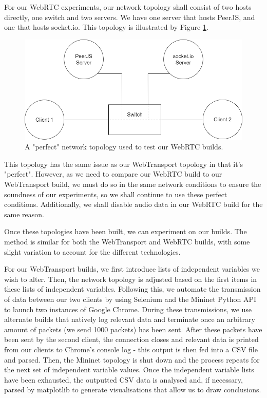 For our WebRTC experiments, our network topology shall consist of two hosts directly, one switch and two servers. We have one server that hosts PeerJS, and one that hosts socket.io. This topology is illustrated by Figure \ref{perfect-topology-webrtc}.

\begin{figure}[h]
    \centering
    \includegraphics[width=0.7\columnwidth]{images/p2p-topology.png}
	\caption{A "perfect" network topology used to test our WebRTC builds.}
    \label{perfect-topology-webrtc}
\end{figure}

This topology has the same issue as our WebTransport topology in that it's "perfect". However, as we need to compare our WebRTC build to our WebTransport build, we must do so in the same network conditions to ensure the soundness of our experiments, so we shall continue to use these perfect conditions. Additionally, we shall disable audio data in our WebRTC build for the same reason.

Once these topologies have been built, we can experiment on our builds. The method is similar for both the WebTransport and WebRTC builds, with some slight variation to account for the different technologies. 

For our WebTransport builds, we first introduce lists of independent variables we wish to alter. Then, the network topology is adjusted based on the first items in these lists of independent variables. Following this, we automate the transmission of data between our two clients by using Selenium and the Mininet Python API to launch two instances of Google Chrome. During these transmissions, we use alternate builds that natively log relevant data and terminate once an arbitrary amount of packets (we send 1000 packets) has been sent. After these packets have been sent by the second client, the connection closes and relevant data is printed from our clients to Chrome's console log - this output is then fed into a CSV file and parsed. Then, the Mininet topology is shut down and the process repeats for the next set of independent variable values. Once the independent variable lists have been exhausted,  the outputted CSV data is analysed and, if necessary, parsed by matplotlib to generate visualisations that allow us to draw conclusions. 


